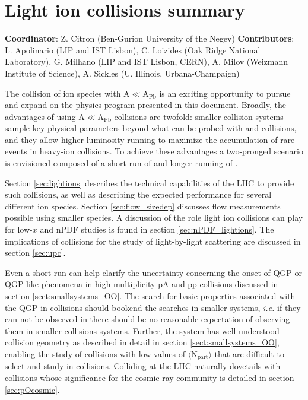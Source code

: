 \documentclass[../report.tex]{subfiles}
\begin{document}
\section{Light ion collisions summary}
\label{sec:smallAsum}
{ \small
\noindent \textbf{Coordinator}: Z. Citron (Ben-Gurion University of the Negev)
\noindent \textbf{Contributors}:
L. Apolinario (LIP and IST Lisbon),
C. Loizides (Oak Ridge National Laboratory),
G. Milhano (LIP and IST Lisbon, CERN),
A. Milov (Weizmann Institute of Science),
A. Sickles (U. Illinois, Urbana-Champaign)
}


The collision of ion species with A$\ll$A$_\mathrm{Pb}$ is an exciting opportunity to pursue and expand on the physics program presented in this document.  Broadly, the advantages of using A$\ll$A$_\mathrm{Pb}$  collisions are twofold: smaller collision systems sample key physical parameters beyond what can be probed with \PbPb and \pPb collisions, and they allow higher luminosity running to maximize the accumulation of rare events in heavy-ion collisions. 
To achieve these advantages a two-pronged scenario is envisioned composed of a short run of \OO and longer running of \ArAr.

Section \ref{sec:lightions} describes the technical capabilities of the LHC to provide such collisions, as well as describing the expected performance for several different ion species.  Section \ref{sec:flow_sizedep} discusses flow measurements possible using smaller species.  A discussion of the role light ion collisions can play for low-$x$ and nPDF studies is found in section \ref{sec:nPDF_lightions}.  The implications of \ArAr collisions for the study of light-by-light scattering are discussed in section \ref{sec:upc}. 

Even a short \OO run can help clarify the uncertainty concerning the onset of QGP or QGP-like phenomena in high-multiplicity pA and pp collisions discussed in section \ref{sect:smallsystems_OO}.  The search for basic properties associated with the QGP in \OO collisions should bookend the searches in smaller systems, \textit{i.e.} if they can not be observed in \OO there should be no reasonable expectation of observing them in smaller collisions systems.  Further, the \OO system has well understood collision geometry as described in detail in section \ref{sect:smallsystems_OO}, enabling the study of collisions with low values of $\langle \mathrm{N_{part}}\rangle$ that are difficult to select and study in \PbPb collisions.  Colliding \OO at the LHC naturally dovetails with \pO collisions whose significance for the cosmic-ray community is detailed in section \ref{sec:pOcosmic}.
\end{document}
